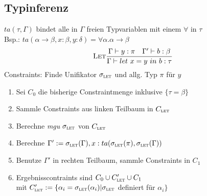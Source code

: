 \documentclass{Zusammenfassung}
\newcommand{\typeRule}[3]{ \textrm{\textsc{#1}}\frac{#2}{#3}}
\newcommand{\E}{\;}
\newcommand{\liin}[2]{#1\E{}#2}
\newcommand{\lii}[2]{(#1\E{}#2)}
\newcommand{\abs}[2]{\lambda{}#1.#2}
\newcommand{\mylet}[3]{let\ #1=#2\ in\ #3}
\begin{document}
\subsection{Typinferenz}
    $ta(\tau,\Gamma)$ bindet alle in $\Gamma$ freien Typvariablen mit einem $\forall$ in $\tau$\\
    Bsp.: $ta(\alpha\rightarrow\beta,x:\beta,y:\delta)=\forall\alpha.\alpha\rightarrow\beta$
    \begin{equation*}
        \typeRule{Let}{\Gamma\vdash{}y:\pi\quad\Gamma'\vdash{}b:\beta}{\Gamma\vdash\mylet{x}{y}{b:\tau}}
    \end{equation*}
    Constraints: Finde Unifikator $\sigma_\textsc{let}$ und allg. Typ $\pi$ für $y$
    \begin{enumerate}
        \item Sei $C_0$ die bisherige Constraintmenge inklusive $\{\tau=\beta\}$
        \item Sammle Constraints aus linken Teilbaum in $C_\textsc{let}$
        \item Berechne \textit{mgu} $\sigma_\textsc{let}$ von $C_\textsc{let}$
        \item Berechne $\Gamma':=\sigma_\textsc{let}(\Gamma),x:ta(\sigma_\textsc{let}(\pi),\sigma_\textsc{let}(\Gamma))$
        \item Benutze $\Gamma'$ in rechten Teilbaum, sammle Constraints in $C_1$
        \item Ergebnisscontraints sind $C_0\cup{}C'_\textsc{let}\cup{}C_1$\\
        mit $C'_\textsc{let} := \{\alpha_i = \sigma_\textsc{let}(\alpha_i)|\sigma_\textsc{let}$ definiert für $\alpha_i\}$
    \end{enumerate}
%
%
\end{document}
